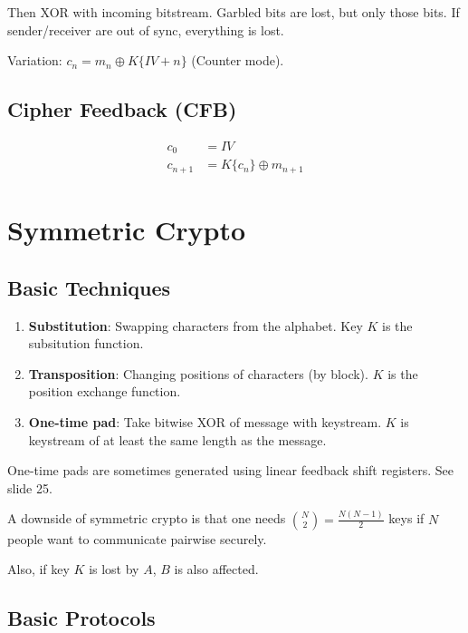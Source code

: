\documentclass{article}
\begin{document}
Then XOR with incoming bitstream. Garbled bits are lost, but only those bits.
If sender/receiver are out of sync, everything is lost.

Variation: $c_n = m_n \oplus K\{IV + n\}$ (Counter mode).

\subsection{Cipher Feedback (CFB)}

\begin{align*}
  c_0 &= IV \\
  c_{n+1} &= K\{c_n\} \oplus m_{n+1}
\end{align*}

\section{Symmetric Crypto}

\subsection{Basic Techniques}

\begin{enumerate}

  \item \textbf{Substitution}: Swapping characters from the alphabet. Key $K$
    is the subsitution function.

  \item \textbf{Transposition}: Changing positions of characters (by block).
    $K$ is the position exchange function.

  \item \textbf{One-time pad}: Take bitwise XOR of message with keystream.
    $K$ is keystream of at least the same length as the message.

\end{enumerate}

One-time pads are sometimes generated using linear feedback shift registers. See
slide 25.

A downside of symmetric crypto is that one needs ${N \choose 2}
= \frac{N(N-1)}{2}$ keys if $N$ people want to communicate pairwise securely.

Also, if key $K$ is lost by $A$, $B$ is also affected.

\subsection{Basic Protocols}
\end{document}
